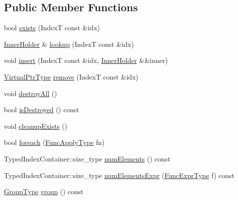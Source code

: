 \subsection*{Public Member Functions}
\begin{DoxyCompactItemize}
\item 
bool \hyperlink{structvt_1_1vrt_1_1collection_1_1_holder_a15b1f2f386c124191f01400fecf24464}{exists} (IndexT const \&idx)
\item 
\hyperlink{structvt_1_1vrt_1_1collection_1_1_holder_aafc9b515450179bad7f03e17010b59f8}{Inner\+Holder} \& \hyperlink{structvt_1_1vrt_1_1collection_1_1_holder_a68c05b8ae4f8755eb388f50da5c9553b}{lookup} (IndexT const \&idx)
\item 
void \hyperlink{structvt_1_1vrt_1_1collection_1_1_holder_a67967ed879eafbbb2e8bb1230bc38874}{insert} (IndexT const \&idx, \hyperlink{structvt_1_1vrt_1_1collection_1_1_holder_aafc9b515450179bad7f03e17010b59f8}{Inner\+Holder} \&\&inner)
\item 
\hyperlink{structvt_1_1vrt_1_1collection_1_1_holder_a04ba57a7b2c48ce6b4c90d3f3b33f43c}{Virtual\+Ptr\+Type} \hyperlink{structvt_1_1vrt_1_1collection_1_1_holder_ae2cd807c3b44832151b7f7d05a07e879}{remove} (IndexT const \&idx)
\item 
void \hyperlink{structvt_1_1vrt_1_1collection_1_1_holder_ae4bd4f8f82713c8b4b2ea0b472fe7192}{destroy\+All} ()
\item 
bool \hyperlink{structvt_1_1vrt_1_1collection_1_1_holder_a974126763d197024453d3ed2dcc9d215}{is\+Destroyed} () const
\item 
void \hyperlink{structvt_1_1vrt_1_1collection_1_1_holder_aa6641e97e87778904b76dba93a69bb56}{cleanup\+Exists} ()
\item 
bool \hyperlink{structvt_1_1vrt_1_1collection_1_1_holder_a9cd9b190a9e1cf6726c520623a2ff4d2}{foreach} (\hyperlink{structvt_1_1vrt_1_1collection_1_1_holder_a26e20d23447e935e218a07ffd638706d}{Func\+Apply\+Type} fn)
\item 
Typed\+Index\+Container\+::size\+\_\+type \hyperlink{structvt_1_1vrt_1_1collection_1_1_holder_aebff9d8a0b857688bf3b303cb832b543}{num\+Elements} () const
\item 
Typed\+Index\+Container\+::size\+\_\+type \hyperlink{structvt_1_1vrt_1_1collection_1_1_holder_aafc7aad37f14db35c91d3e085bdf0500}{num\+Elements\+Expr} (\hyperlink{structvt_1_1vrt_1_1collection_1_1_holder_a5c28963c09fd935028444c5a09fada2d}{Func\+Expr\+Type} f) const
\item 
\hyperlink{namespacevt_a27b5e4411c9b6140c49100e050e2f743}{Group\+Type} \hyperlink{structvt_1_1vrt_1_1collection_1_1_holder_a579e33999a2d66ded9c3751be3ba11f8}{group} () const

\end{DoxyCompactItemize}
